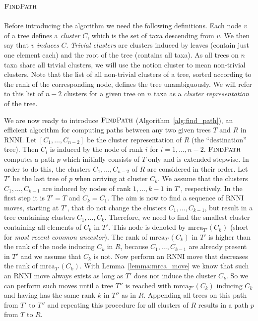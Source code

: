 \documentclass{amsart}
\newcommand{\mrca}{\mathrm{mrca}}
\newcommand{\rnni}{\mathrm{RNNI}}
\newcommand{\findpath}{\textsc{FindPath}}
\begin{document}
\subsection{$\findpath$}
\label{section:alg_findpath}

Before introducing the algorithm we need the following definitions.
Each node $v$ of a tree defines a \emph{cluster} $C$, which is the set of taxa descending from $v$.
We then say that $v$ \emph{induces} $C$.
\emph{Trivial clusters} are clusters induced by leaves (contain just one element each) and the root of the tree (contains all taxa).
As all trees on $n$ taxa share all trivial clusters, we will use the notion cluster to mean non-trivial clusters.
Note that the list of all non-trivial clusters of a tree, sorted according to the rank of the corresponding node, defines the tree unambiguously.
We will refer to this list of $n-2$ clusters for a given tree on $n$ taxa as a \emph{cluster representation} of the tree.

We are now ready to introduce $\findpath$ (Algorithm~\ref{alg:find_path}), an efficient algorithm for computing paths between any two given trees $T$ and $R$ in $\rnni$.
Let $[C_1, \ldots, C_{n-2}]$ be the cluster representation of $R$ (the ``destination'' tree).
Then $C_i$ is induced by the node of rank $i$ for $i = 1, \ldots, n-2$.
$\findpath$ computes a path $p$ which initially consists of $T$ only and is extended stepwise.
In order to do this, the clusters $C_1, \ldots, C_{n-2}$ of $R$ are considered in their order.
Let $T'$ be the last tree of $p$ when arriving at cluster $C_k$.
We assume that the clusters $C_1, \ldots, C_{k-1}$ are induced by nodes of rank $1, \ldots, k-1$ in $T'$, respectively.
In the first step it is $T' = T$ and $C_k = C_1$.
The aim is now to find a sequence of $\rnni$ moves, starting at $T'$, that do not change the clusters $C_1, \ldots, C_{k-1}$, but result in a tree containing clusters $C_1, \ldots, C_{k}$.
Therefore, we need to find the smallest cluster containing all elements of $C_k$ in $T'$.
This node is denoted by $\mrca_{T'}(C_k)$ (short for \emph{most recent common ancestor}).
The rank of $\mrca_{T'}(C_k)$ in $T'$ is higher than the rank of the node inducing $C_k$ in $R$, because $C_1, \ldots, C_{k-1}$ are already present in $T'$ and we assume that $C_k$ is not.
Now perform an $\rnni$ move that decreases the rank of $\mrca_{T'}(C_k)$.
With Lemma~\ref{lemma:mrca_move} we know that such an $\rnni$ move always exists as long as $T'$ does not induce the cluster $C_k$.
So we can perform such moves until a tree $T''$ is reached with $\mrca_{T''}(C_k)$ inducing $C_k$ and having has the same rank $k$ in $T''$ as in $R$.
Appending all trees on this path from $T'$ to $T''$ and repeating this procedure for all clusters of $R$ results in a path $p$ from $T$ to $R$.
\end{document}
